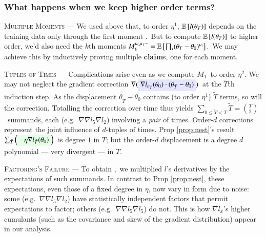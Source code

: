 \subsubsection{What happens when we keep higher order terms?}

\textsc{Multiple Moments} ---
We used above
that, to order $\eta^1$, $\mathbb{E}\left[l(\theta_T)\right]$ depends on the
training data only through the first moment
.\squish\squish\ But to compute  
$\mathbb{E}\left[l(\theta_T)\right]$ to higher order, we'd also need
the $k$th moments $M_k^{\mu_0\mu_1\cdots} = \mathbb{E}\left[\prod_i (\theta_T - \theta_0)^{\mu_i}\right]$.\squish\  We may achieve this by inductively
proving multiple \textbf{claim}s, one for each moment. 

\textsc{Tuples of Times} --- Complications arise even as we compute $M_1$\squish\ to order $\eta^2$.  We may not neglect the gradient
correction $\nabla (\text{\translucent{moosky}{$\nabla
l_{n_{\tilde T}}(\theta_0) \cdot (\theta_{{\tilde T}} -
\theta_0)$}})$\squash\ at the $\tilde{T}$th induction step. As the
displacement $\theta_{{\tilde T}} - \theta_0$ contains (to order
$\eta^1$) $\tilde T$ terms, so will the correction.
%
Totalling the correction over time thus yields
$\sum_{0\leq \tilde T<T}\tilde T = {T \choose 2}$\squish\
summands, each (e.g.\ $\nabla\nabla l_{5} \nabla l_{2}$)
involving a \emph{pair} of times.  Order-$d$
corrections represent the joint influence of $d$-tuples of times.
%
Prop \ref{prop:nest}'s result $\sum_{\tilde T}
\wrap{\text{\translucent{moolime}{$- \eta \nabla l_{{\tilde
T}}(\theta_0)$}}}$\squish\squish\ is degree $1$ in $T$; but the
order-$d$ displacement is a degree $d$ polynomial --- very divergent --- in $T$.

\textsc{Factoring's Failure} --- To obtain ,\squish\ we multiplied
$l$'s derivatives by the expectations of such summands.
%
In contrast to Prop \ref{prop:nest}, these expectations, even those of a fixed
degree in $\eta$, now vary in form due to noise: some (e.g.\
$\nabla\nabla l_{5} \nabla l_{2}$) have statistically independent
factors that permit expectations to factor; others (e.g.\
$\nabla\nabla l_{5} \nabla l_{5}$) do not.  This is how $\nabla
l_x$'s higher cumulants (such as the covariance and skew of the gradient distribution) appear in our analysis.

